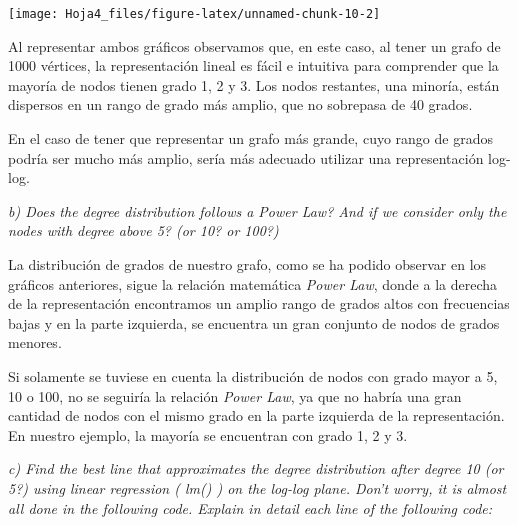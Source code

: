\documentclass[
]{article}
\begin{document}
\begin{center}\texttt{[image: Hoja4\_files/figure-latex/unnamed-chunk-10-2]} \end{center}

Al representar ambos gráficos observamos que, en este caso, al tener un
grafo de 1000 vértices, la representación lineal es fácil e intuitiva
para comprender que la mayoría de nodos tienen grado 1, 2 y 3. Los nodos
restantes, una minoría, están dispersos en un rango de grado más amplio,
que no sobrepasa de 40 grados.

En el caso de tener que representar un grafo más grande, cuyo rango de
grados podría ser mucho más amplio, sería más adecuado utilizar una
representación log-log.

\emph{b) Does the degree distribution follows a Power Law? And if we
consider only the nodes with degree above 5? (or 10? or 100?)}

La distribución de grados de nuestro grafo, como se ha podido observar
en los gráficos anteriores, sigue la relación matemática \emph{Power
Law}, donde a la derecha de la representación encontramos un amplio
rango de grados altos con frecuencias bajas y en la parte izquierda, se
encuentra un gran conjunto de nodos de grados menores.

Si solamente se tuviese en cuenta la distribución de nodos con grado
mayor a 5, 10 o 100, no se seguiría la relación \emph{Power Law}, ya que
no habría una gran cantidad de nodos con el mismo grado en la parte
izquierda de la representación. En nuestro ejemplo, la mayoría se
encuentran con grado 1, 2 y 3.

\emph{c) Find the best line that approximates the degree distribution
after degree 10 (or 5?) using linear regression ( lm() ) on the log-log
plane. Don't worry, it is almost all done in the following code. Explain
in detail each line of the following code:}
\end{document}
